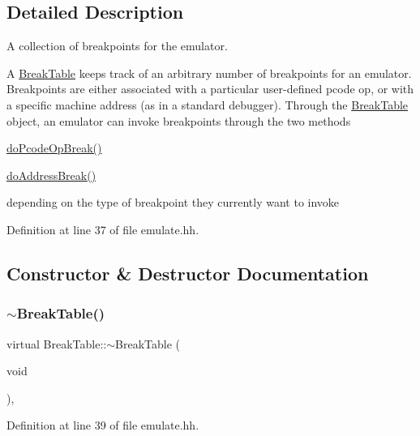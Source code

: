 \subsection{Detailed Description}
A collection of breakpoints for the emulator. 

A \mbox{\hyperlink{class_break_table}{Break\+Table}} keeps track of an arbitrary number of breakpoints for an emulator. Breakpoints are either associated with a particular user-\/defined pcode op, or with a specific machine address (as in a standard debugger). Through the \mbox{\hyperlink{class_break_table}{Break\+Table}} object, an emulator can invoke breakpoints through the two methods
\begin{DoxyItemize}
\item \mbox{\hyperlink{class_break_table_af8829327f29c768f834825fe40b54bad}{do\+Pcode\+Op\+Break()}}
\item \mbox{\hyperlink{class_break_table_a7833a73318fadd483f73fbd33bdffd23}{do\+Address\+Break()}}
\end{DoxyItemize}

depending on the type of breakpoint they currently want to invoke 

Definition at line 37 of file emulate.\+hh.



\subsection{Constructor \& Destructor Documentation}
\mbox{\label{class_break_table_a26f7cfee65cdbe7666fa1554cead8fb3}} 
\subsubsection{\texorpdfstring{$\sim$BreakTable()}{~BreakTable()}}
{\footnotesize\ttfamily virtual Break\+Table\+::$\sim$\+Break\+Table (\begin{DoxyParamCaption}\item[{void}]{ }\end{DoxyParamCaption})\hspace{0.3cm}{\ttfamily [inline]}, {\ttfamily [virtual]}}



Definition at line 39 of file emulate.\+hh.



